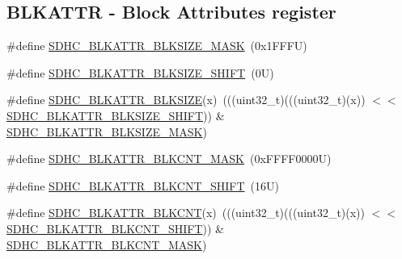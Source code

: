 \subsection*{B\+L\+K\+A\+T\+TR -\/ Block Attributes register}
\begin{DoxyCompactItemize}
\item 
\#define \mbox{\hyperlink{group___s_d_h_c___register___masks_ga15a1d67cd23b4eaae16cf10809520195}{S\+D\+H\+C\+\_\+\+B\+L\+K\+A\+T\+T\+R\+\_\+\+B\+L\+K\+S\+I\+Z\+E\+\_\+\+M\+A\+SK}}~(0x1\+F\+F\+F\+U)
\item 
\#define \mbox{\hyperlink{group___s_d_h_c___register___masks_gab4dbeb59800b35d4f9e1d12f27a3f4d8}{S\+D\+H\+C\+\_\+\+B\+L\+K\+A\+T\+T\+R\+\_\+\+B\+L\+K\+S\+I\+Z\+E\+\_\+\+S\+H\+I\+FT}}~(0\+U)
\item 
\#define \mbox{\hyperlink{group___s_d_h_c___register___masks_ga189a6c8c7269f3fce6679d2dc310c86b}{S\+D\+H\+C\+\_\+\+B\+L\+K\+A\+T\+T\+R\+\_\+\+B\+L\+K\+S\+I\+ZE}}(x)~(((uint32\+\_\+t)(((uint32\+\_\+t)(x)) $<$$<$ \mbox{\hyperlink{group___s_d_h_c___register___masks_gab4dbeb59800b35d4f9e1d12f27a3f4d8}{S\+D\+H\+C\+\_\+\+B\+L\+K\+A\+T\+T\+R\+\_\+\+B\+L\+K\+S\+I\+Z\+E\+\_\+\+S\+H\+I\+FT}})) \& \mbox{\hyperlink{group___s_d_h_c___register___masks_ga15a1d67cd23b4eaae16cf10809520195}{S\+D\+H\+C\+\_\+\+B\+L\+K\+A\+T\+T\+R\+\_\+\+B\+L\+K\+S\+I\+Z\+E\+\_\+\+M\+A\+SK}})
\item 
\#define \mbox{\hyperlink{group___s_d_h_c___register___masks_ga797a081db083b97f61d5f657ae83f752}{S\+D\+H\+C\+\_\+\+B\+L\+K\+A\+T\+T\+R\+\_\+\+B\+L\+K\+C\+N\+T\+\_\+\+M\+A\+SK}}~(0x\+F\+F\+F\+F0000\+U)
\item 
\#define \mbox{\hyperlink{group___s_d_h_c___register___masks_ga1461e7582635ec25e017243f95a9e649}{S\+D\+H\+C\+\_\+\+B\+L\+K\+A\+T\+T\+R\+\_\+\+B\+L\+K\+C\+N\+T\+\_\+\+S\+H\+I\+FT}}~(16\+U)
\item 
\#define \mbox{\hyperlink{group___s_d_h_c___register___masks_ga02677301c96c876e9db0d959ce6d5585}{S\+D\+H\+C\+\_\+\+B\+L\+K\+A\+T\+T\+R\+\_\+\+B\+L\+K\+C\+NT}}(x)~(((uint32\+\_\+t)(((uint32\+\_\+t)(x)) $<$$<$ \mbox{\hyperlink{group___s_d_h_c___register___masks_ga1461e7582635ec25e017243f95a9e649}{S\+D\+H\+C\+\_\+\+B\+L\+K\+A\+T\+T\+R\+\_\+\+B\+L\+K\+C\+N\+T\+\_\+\+S\+H\+I\+FT}})) \& \mbox{\hyperlink{group___s_d_h_c___register___masks_ga797a081db083b97f61d5f657ae83f752}{S\+D\+H\+C\+\_\+\+B\+L\+K\+A\+T\+T\+R\+\_\+\+B\+L\+K\+C\+N\+T\+\_\+\+M\+A\+SK}})
\end{DoxyCompactItemize}
